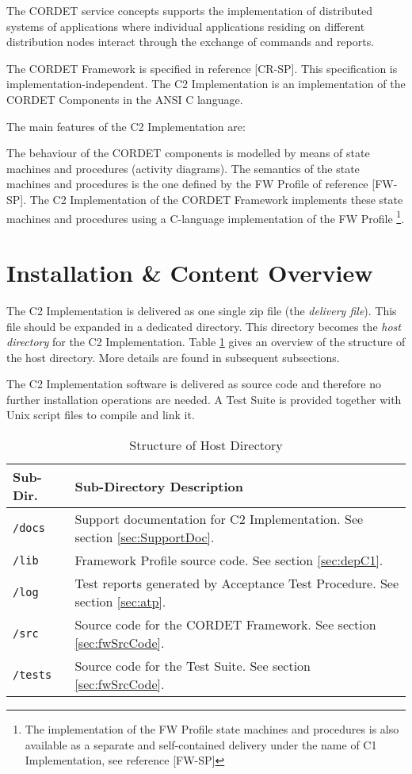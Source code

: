 \documentclass{pnp_article}
\begin{document}
The CORDET service concepts supports the implementation of distributed systems of applications where individual applications residing on different distribution nodes interact through the exchange of commands and reports.

The CORDET Framework is specified in reference [CR-SP]. This specification is implementation-independent. The C2 Implementation is an implementation of the CORDET Components in the ANSI C language.

The main features of the C2 Implementation are:


The behaviour of the CORDET components is modelled by means of state machines and procedures (activity diagrams). The semantics of the state machines and procedures is the one defined by the FW Profile of reference [FW-SP]. The C2 Implementation of the CORDET Framework implements these state machines and procedures using a C-language implementation of the FW Profile \footnote{The implementation of the FW Profile state machines and procedures is also available as a separate and self-contained delivery under the name of C1 Implementation, see reference [FW-SP]}. 

\section{Installation \& Content Overview}\label{sec:InstAndContentOverview}
The C2 Implementation is delivered as one single zip file (the \emph{delivery file}).
This file should be expanded in a dedicated directory. 
This directory becomes the \emph{host directory} for the C2 Implementation.
Table \ref{tab:HostDir} gives an overview of the structure of the host directory.
More details are found in subsequent subsections.

The C2 Implementation software is delivered as source code and therefore no further installation operations are needed. A Test Suite is provided together with Unix script files to compile and link it.

\begin{longtable}{|l|p{11cm}|}
\caption{Structure of Host Directory}\label{tab:HostDir} \\
\hline
\rowcolor{light-gray}
\textbf{Sub-Dir.} & \textbf{Sub-Directory Description}\\
\hline\hline
\texttt{/docs} & Support documentation for C2 Implementation. See section \ref{sec:SupportDoc}.\\
\hline
\texttt{/lib} & Framework Profile source code. See section \ref{sec:depC1}.\\
\hline
\texttt{/log} & Test reports generated by Acceptance Test Procedure. See section \ref{sec:atp}.\\
\hline
\texttt{/src} & Source code for the CORDET Framework. See section \ref{sec:fwSrcCode}.\\
\hline
\texttt{/tests} & Source code for the Test Suite. See section \ref{sec:fwSrcCode}.\\
\hline
\end{longtable}
\end{document}
